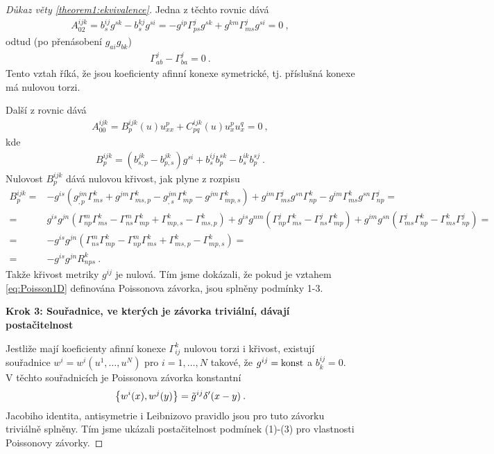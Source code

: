 \begin{proof}[Důkaz věty \ref{theorem1:ekvivalence}]
    Jedna z těchto rovnic dává
    \begin{align}
        A_{02}^{ijk} = b^{ij}_s g^{sk} - b^{kj}_s g^{si} = -g^{ip} \Gamma^{j}_{ps} g^{sk} + g^{km} \Gamma^{j}_{ms} g^{si} =0 \:,
    \end{align}
    odtud (po přenásobení $g_{ai}g_{bk}$)
    \begin{align}
        \Gamma^j_{ab} - \Gamma^j_{ba} = 0 \:.
    \end{align}
    Tento vztah říká, že jsou koeficienty afinní konexe symetrické, tj. příslušná konexe má nulovou torzi.

   Další z rovnic dává
    \begin{align}
        A_{00}^{ijk} = B^{ijk}_p(u) u^p_{xx} + C^{ijk}_{pq}(u) u^p_x u^q_x = 0 \:,
    \end{align}
    kde 
    \begin{align}
        B^{ijk}_p 
        = (b^{jk}_{s,p} - b^{jk}_{p,s}) g^{si} + b_s^{ij} b_p^{sk} - b_s^{ik} b_p^{sj} \:.
    \end{align}
    Nulovost $B^{ijk}_p$ dává nulovou křivost, jak plyne z rozpisu
    \begin{align}
        B^{ijk}_p  
        =& -g^{is} \left( g^{jm}_{,p} \Gamma^k_{ms} + g^{jm} \Gamma^k_{ms,p} - g^{jm}_{,s} \Gamma^k_{mp} - g^{jm} \Gamma^k_{mp,s} \right) + g^{im} \Gamma^j_{ms} g^{sn} \Gamma^{k}_{np} - g^{im} \Gamma^k_{ms} g^{sn} \Gamma^j_{np}
        = \\ =& g^{is} g^{jn} \left( \Gamma^m_{np} \Gamma^k_{ms} - \Gamma^{m}_{ns} \Gamma^k_{mp} + \Gamma^{k}_{mp,s} -  \Gamma^{k}_{ms,p} \right) + g^{is} g^{nm} \left( \Gamma^j_{np} \Gamma^{k}_{ms} - \Gamma^j_{ns} \Gamma^k_{mp} \right) + g^{im} g^{sn} \left( \Gamma^j_{ms} \Gamma^k_{np} - \Gamma^k_{ms} \Gamma^j_{np} \right)
        = \\ =& -g^{is} g^{jn} \left( \Gamma^{m}_{ns} \Gamma^k_{mp}  - \Gamma^m_{np} \Gamma^k_{ms} + \Gamma^{k}_{ms,p} - \Gamma^{k}_{mp,s} \right)
        = \\ =& -g^{is} g^{jn} R^k_{nps} \:.
    \end{align}
    Takže křivost metriky $g^{ij}$ je nulová. Tím jsme dokázali, že pokud je vztahem \eqref{eq:Poisson1D} definována Poissonova závorka, jsou splněny podmínky 1-3.

    \textbf{Krok 3: Souřadnice, ve kterých je závorka triviální, dávají postačitelnost}

    Jestliže mají koeficienty afinní konexe $\Gamma_{ij}^k$ nulovou torzi i křivost, existují souřadnice $w^i=w^i(u^1,\dots,u^N)$ pro $i=1,\dots,N$ takové, že $g^{ij} = \mathrm{konst}$ a $b^{ij}_k = 0$. V těchto souřadnicích je Poissonova závorka konstantní
    \begin{align}
        \left \lbrace w^i(x),w^j(y) \right \rbrace = \tilde{g}^{ij} \delta'(x-y) \:.
    \end{align}
    Jacobiho identita, antisymetrie i Leibnizovo pravidlo jsou pro tuto závorku triviálně splněny. Tím jsme ukázali postačitelnost podmínek (1)-(3) pro vlastnosti Poissonovy závorky.
\end{proof}

